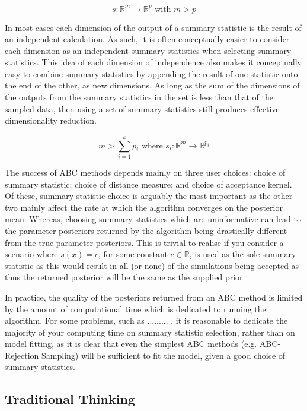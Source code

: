 \documentclass[11pt,a4paper]{article}
\theoremstyle{break}
\begin{document}
  \[ s:\mathbb{R}^m\to\mathbb{R}^p\text{ with }m>p \]

  \par In most cases each dimension of the output of a summary statistic is the result of an independent calculation. As such, it is often conceptually easier to consider each dimension as an independent summary statistics when selecting summary statistics. This idea of each dimension of independence also makes it conceptually easy to combine summary statistics by appending the result of one statistic onto the end of the other, as new dimensions. %
  As long as the sum of the dimensions of the outputs from the summary statistics in the set is less than that of the sampled data, then using a set of summary statistics still produces effective dimensionality reduction.

  \[ m>\sum_{i=1}^kp_i\text{ where }s_i:\mathbb{R}^m\to\mathbb{R}^{p_i} \]

  The success of ABC methods depends mainly on three user choices: choice of summary statistic; choice of distance measure; and choice of acceptance kernel. Of these, summary statistic choice is arguably the most important as the other two mainly affect the rate at which the algorithm converges on the posterior mean. Whereas, choosing summary statistics which are uninformative can lead to the parameter posteriors returned by the algorithm being drastically different from the true parameter posteriors. This is trivial to realise if you consider a scenario where $s(x)=c$, for some constant $c\in\mathbb{R}$, is used as the sole summary statistic as this would result in all (or none) of the simulations being accepted as thus the returned posterior will be the same as the supplied prior.

  \par In practice, the quality of the posteriors returned from an ABC method is limited by the amount of computational time which is dedicated to running the algorithm. For some problems, such as ......... %
  , it is reasonable to dedicate the majority of your computing time on summary statistic selection, rather than on model fitting, as it is clear that even the simplest ABC methods (e.g. ABC-Rejection Sampling) will be sufficient to fit the model, given a good choice of summary statistics.

  \subsection*{Traditional Thinking}\label{sec_summary_stats_traditional_thinking}
\end{document}
